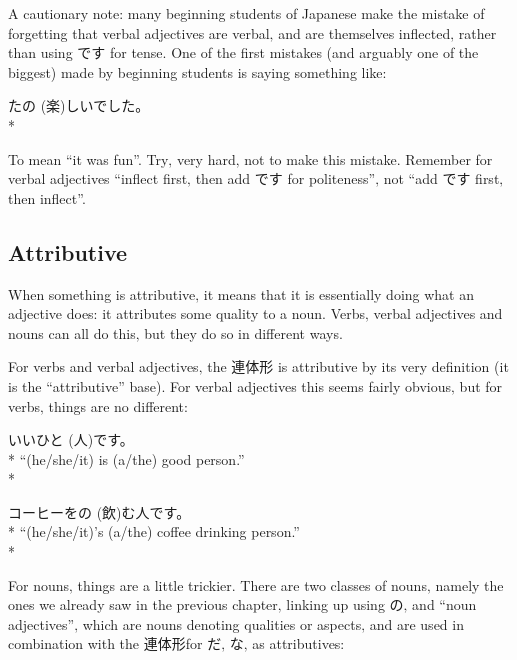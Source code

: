 \documentclass[11pt, b5paper, twoside, openright, onecolumn]{book}
\makeatletter
\newcommand*{\rubystack}[2]{{\relscale{0.5}%
  \begin{tabular}[b]{@{}c@{}}%
    {#1}\\%
   {\textscale{2}{#2}}%
  \end{tabular}}%
}
\DeclareRobustCommand*{\ruby}[2]{%
  \mbox{%
    \setlength{\parskip}{0ex}%
    \BeginAccSupp{method=pdfstringdef,ActualText={#1}}%
      \rubystack{\phantom{#2}}{#1}%
      \llap{%
        \rubystack{#2}{\phantom{#1}}%
      }%
    \EndAccSupp{}%
  }%
}
\renewcommand*{\ruby}[2]{#2 (#1)}%
\newenvironment{exampleblock}{
\setlength{\parindent}{0.6in}
\begin{minipage}[t]{\dimexpr\textwidth-\parindent}}
{\end{minipage}}
\makeatother
\begin{document}
A cautionary note: many beginning students of Japanese make the mistake of forgetting that verbal adjectives are verbal‚ and are themselves inflected‚ rather than using です for tense. One of the first mistakes (and arguably one of the biggest) made by beginning students is saying something like:

\vspace{0.4cm}
\begin{exampleblock}
\ruby{楽}{たの}しいでした。 \\* 
\end{exampleblock}
\vspace{0.2cm}

To mean “it was fun”. Try‚ very hard‚ not to make this mistake. Remember for verbal adjectives “inflect first‚ then add です for politeness”‚ not “add です first‚ then inflect”.

\subsection{Attributive}

When something is attributive‚ it means that it is essentially doing what an adjective does: it attributes some quality to a noun. Verbs‚ verbal adjectives and nouns can all do this‚ but they do so in different ways.

For verbs  and verbal adjectives‚ the 連体形 is attributive by its very definition (it is the “attributive” base). For verbal adjectives this seems fairly obvious‚ but for verbs‚ things are no different:

\vspace{0.4cm}
\begin{exampleblock}
いい\ruby{人}{ひと}です。 \\* 
“(he/she/it) is (a/the) good person.” \\* 
\end{exampleblock}
\vspace{0.2cm}

\begin{exampleblock}
コーヒーを\ruby{飲}{の}む人です。 \\* 
“(he/she/it)’s (a/the) coffee drinking person.” \\* 
\end{exampleblock}
\vspace{0.2cm}

For nouns‚ things are a little trickier. There are two classes of nouns‚ namely the ones we already saw in the previous chapter‚ linking up using の‚ and “noun adjectives”‚ which are nouns denoting qualities or aspects‚ and are used in combination with the 連体形for だ‚ な‚ as attributives:
\end{document}
